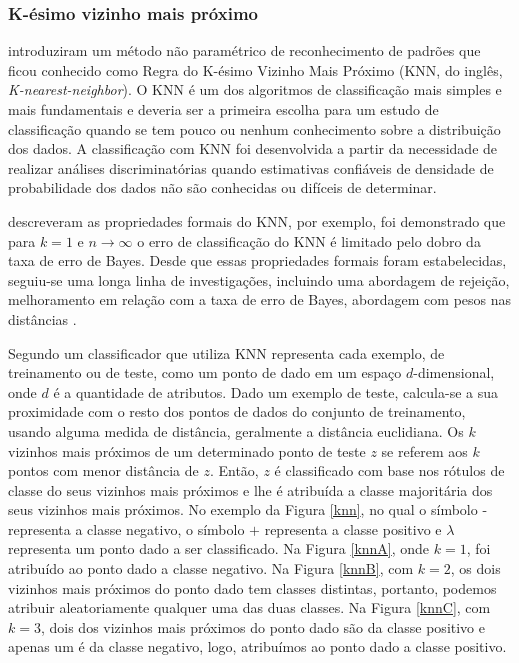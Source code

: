 \subsubsection{K-ésimo vizinho mais próximo}

 introduziram um método não paramétrico de
reconhecimento de padrões que ficou conhecido como Regra do K-ésimo Vizinho Mais
Próximo (KNN, do inglês, \textit{K-nearest-neighbor}). O KNN é um dos algoritmos
de classificação mais simples e mais fundamentais e deveria ser a primeira
escolha para um estudo de classificação quando se tem pouco ou nenhum
conhecimento sobre a distribuição dos dados. A classificação com KNN foi
desenvolvida a partir da necessidade de realizar análises discriminatórias
quando estimativas confiáveis de densidade de probabilidade dos dados não são
conhecidas ou difíceis de determinar.

 descreveram as propriedades formais do KNN, por
exemplo, foi demonstrado que para \(k = 1\) e \(n \to \infty\) o erro de
classificação do KNN é limitado pelo dobro da taxa de erro de Bayes. Desde que
essas propriedades formais foram estabelecidas, seguiu-se uma longa linha de
investigações, incluindo uma abordagem de rejeição, melhoramento em relação com
a taxa de erro de Bayes, abordagem com pesos nas distâncias
\cite{peterson2009knn}.

Segundo  um classificador que utiliza KNN
representa cada exemplo, de treinamento ou de teste, como um ponto de dado em um
espaço \(d\)-dimensional, onde \(d\) é a quantidade de atributos. Dado um
exemplo de teste, calcula-se a sua proximidade com o resto dos pontos de dados
do conjunto de treinamento, usando alguma medida de distância, geralmente a
distância euclidiana. Os \(k\) vizinhos mais próximos de um determinado ponto de
teste \(z\) se referem aos \(k\) pontos com menor distância de \(z\). Então,
\(z\) é classificado com base nos rótulos de classe do seus vizinhos mais
próximos e lhe é atribuída a classe majoritária dos seus vizinhos mais próximos.
No exemplo da Figura \ref{knn}, no qual o símbolo \(\textbf{-}\)
representa a classe negativo, o símbolo \(\textbf{+}\) representa a classe
positivo e \(\lambda\) representa um ponto dado a ser classificado. Na Figura
\ref{knnA}, onde \(k = 1\), foi atribuído ao ponto dado a classe negativo. Na
Figura \ref{knnB}, com \(k = 2\), os dois vizinhos mais próximos do ponto dado
tem classes distintas, portanto, podemos atribuir aleatoriamente qualquer uma
das duas classes. Na Figura \ref{knnC}, com \(k = 3\), dois dos vizinhos mais
próximos do ponto dado são da classe positivo e apenas um é da classe negativo,
logo, atribuímos ao ponto dado a classe positivo.

